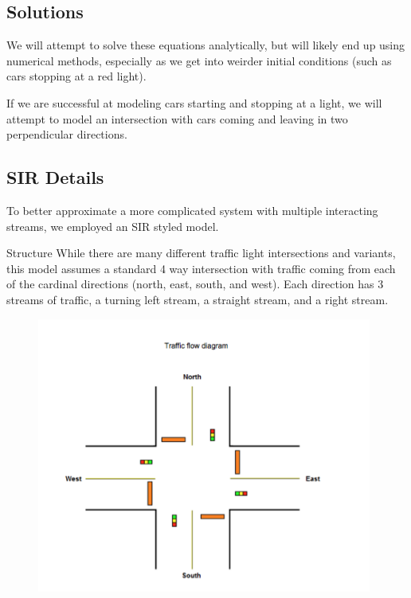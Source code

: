\documentclass[12pt]{article}
\begin{document}
	\subsection{Solutions}
	
	We will attempt to solve these equations analytically, but will likely end up using numerical methods, especially as we get into weirder initial conditions (such as cars stopping at a red light). 
	
	If we are successful at modeling cars starting and stopping at a light, we will attempt to model an intersection with cars coming and leaving in two perpendicular directions.
	
	
	\subsection{SIR Details}
	To better approximate a more complicated system with multiple interacting streams, we employed an SIR styled model. 
	
	Structure
	While there are many different traffic light intersections and variants, this model assumes a standard 4 way intersection with traffic coming from each of the cardinal directions (north, east, south, and west). Each direction has 3 streams of traffic, a turning left stream, a straight stream, and a right stream. 
	
	\begin{figure}[htp]
		\centering
		\includegraphics[width=11cm]{figures/TrafficDiagrampng.png}
		\label{fig:diagram}
	\end{figure}
	
\end{document}
